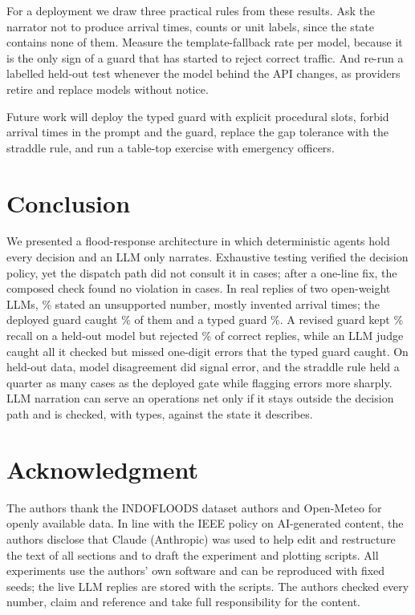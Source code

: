 \documentclass[conference]{IEEEtran}
\begin{document}
For a deployment we draw three practical rules from these results. Ask the narrator not to produce arrival times, counts or unit labels, since the state contains none of them. Measure the template-fallback rate per model, because it is the only sign of a guard that has started to reject correct traffic. And re-run a labelled held-out test whenever the model behind the API changes, as providers retire and replace models without notice.

Future work will deploy the typed guard with explicit procedural slots, forbid arrival times in the prompt and the guard, replace the gap tolerance with the straddle rule, and run a table-top exercise with emergency officers.

\section{Conclusion}
We presented a flood-response architecture in which deterministic agents hold every decision and an LLM only narrates. Exhaustive testing verified the decision policy, yet the dispatch path did not consult it in \EtoEViolBefore{} cases; after a one-line fix, the composed check found no violation in \EtoECases{} cases. In \LiveN{} real replies of two open-weight LLMs, \LiveUnsupPct\% stated an unsupported number, mostly invented arrival times; the deployed guard caught \LiveDepRec\% of them and a typed guard \LiveTypRec\%. A revised guard kept \HoVtwoRec\% recall on a held-out model but rejected \HoVtwoFpr\% of correct replies, while an LLM judge caught all it checked but missed one-digit errors that the typed guard caught. On held-out data, model disagreement did signal error, and the straddle rule held a quarter as many cases as the deployed gate while flagging errors more sharply. LLM narration can serve an operations net only if it stays outside the decision path and is checked, with types, against the state it describes.

\section*{Acknowledgment}
The authors thank the INDOFLOODS dataset authors and Open-Meteo for openly available data.
In line with the IEEE policy on AI-generated content, the authors disclose that Claude (Anthropic) was used to help edit and restructure the text of all sections and to draft the experiment and plotting scripts. All experiments use the authors' own software and can be reproduced with fixed seeds; the live LLM replies are stored with the scripts. The authors checked every number, claim and reference and take full responsibility for the content.
\end{document}
